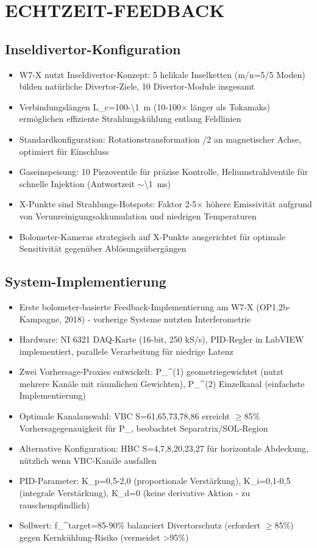 \documentclass[11pt,a4paper]{article}
\begin{document}
\section{ECHTZEIT-FEEDBACK}

\subsection{Inseldivertor-Konfiguration}

\begin{itemize}
\item W7-X nutzt Inseldivertor-Konzept: 5 helikale Inselketten (m/n=5/5 Moden) bilden natürliche Divertor-Ziele, 10 Divertor-Module insgesamt
\item Verbindungslängen L_c=100-\SI{\1}{m} (10-100$\times$ länger als Tokamaks) ermöglichen effiziente Strahlungskühlung entlang Feldlinien
\item Standardkonfiguration: Rotationstransformation \iota/2 an magnetischer Achse, optimiert für Einschluss
\item Gaseinspeisung: 10 Piezoventile für präzise Kontrolle, Heliumstrahlventile für schnelle Injektion (Antwortzeit $\sim$\SI{\1}{m}s)
\item X-Punkte sind Strahlungs-Hotspots: Faktor 2-5$\times$ höhere Emissivität aufgrund von Verunreinigungsakkumulation und niedrigen Temperaturen
\item Bolometer-Kameras strategisch auf X-Punkte ausgerichtet für optimale Sensitivität gegenüber Ablösungsübergängen
\end{itemize}

\subsection{System-Implementierung}

\begin{itemize}
\item Erste bolometer-basierte Feedback-Implementierung am W7-X (OP1.2b-Kampagne, 2018) - vorherige Systeme nutzten Interferometrie
\item Hardware: NI 6321 DAQ-Karte (16-bit, 250 kS/s), PID-Regler in LabVIEW implementiert, parallele Verarbeitung für niedrige Latenz
\item Zwei Vorhersage-Proxies entwickelt: P_{}^(1) geometriegewichtet (nutzt mehrere Kanäle mit räumlichen Gewichten), P_{}^(2) Einzelkanal (einfachste Implementierung)
\item Optimale Kanalauswahl: VBC S={61,65,73,78,86} erreicht $\geq$85\% Vorhersagegenauigkeit für P_{}, beobachtet Separatrix/SOL-Region
\item Alternative Konfiguration: HBC S={4,7,8,20,23,27} für horizontale Abdeckung, nützlich wenn VBC-Kanäle ausfallen
\item PID-Parameter: K_p=0,5-2,0 (proportionale Verstärkung), K_i=0,1-0,5 (integrale Verstärkung), K_d=0 (keine derivative Aktion - zu rauschempfindlich)
\item Sollwert: f_{}^target=85-90\% balanciert Divertorschutz (erfordert $\geq$85\%) gegen Kernkühlung-Risiko (vermeidet >95\%)
\end{itemize}
\end{document}
